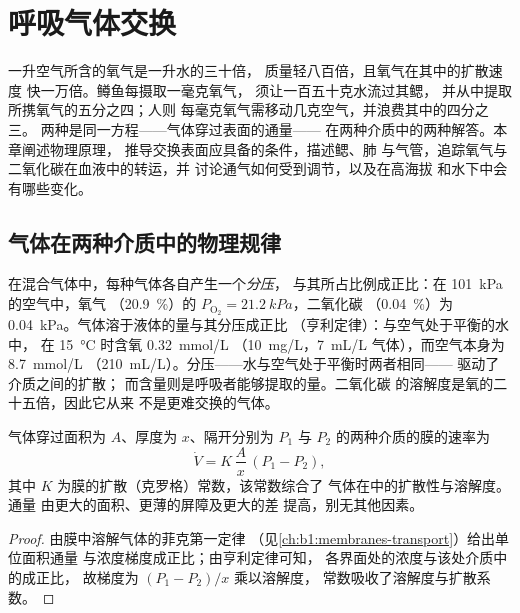 \chapter{呼吸气体交换}\label{ch:b1:gas-exchange}

一升空气所含的氧气是一升水的三十倍，
质量轻八百倍，且氧气在其中的扩散速度
快一万倍。鳟鱼每摄取一毫克氧气，
须让一百五十克水流过其鳃，
并从中提取所携氧气的五分之四；人则
每毫克氧气需移动几克空气，并浪费其中的四分之三。
两种是同一方程——气体穿过表面的通量——
在两种介质中的两种解答。本章阐述物理原理，
推导交换表面应具备的条件，描述鳃、肺
与气管，追踪氧气与二氧化碳在血液中的转运，并
讨论通气如何受到调节，以及在高海拔
和水下中会有哪些变化。

\section{气体在两种介质中的物理规律}

\begin{definition}[分压、溶解度]\label{def:b1:gas-exchange:partial}
在混合气体中，每种气体各自产生一个\emph{分压}，
与其所占比例成正比：在 \qty{101}{kPa} 的空气中，氧气
（\qty{20.9}{\%}）的 $P_{\mathrm{O_2}} = \qty{21.2}{kPa}$，二氧化碳
（\qty{0.04}{\%}）为 \qty{0.04}{kPa}。气体溶于液体的量与其分压成正比
（亨利定律）：与空气处于平衡的水中，
在 \qty{15}{\celsius} 时含氧 \qty{0.32}{mmol/L}
（\qty{10}{mg/L}，\qty{7}{mL/L} 气体），而空气本身为 \qty{8.7}{mmol/L}
（\qty{210}{mL/L}）。分压——水与空气处于平衡时两者相同——
驱动了介质之间的扩散；
而含量则是呼吸者能够提取的量。二氧化碳
的溶解度是氧的二十五倍，因此它从来
不是更难交换的气体。
\end{definition}

\begin{theorem}[交换表面的菲克定律]\label{thm:b1:gas-exchange:fick}
气体穿过面积为 $A$、厚度为
$x$、隔开分别为 $P_1$ 与 $P_2$ 的两种介质的膜的速率为
\[
\dot V = K\,\frac{A}{x}\,(P_1 - P_2),
\]
其中 $K$ 为膜的扩散（克罗格）常数，该常数综合了
气体在中的扩散性与溶解度。通量
由更大的面积、更薄的屏障及更大的差
提高，别无其他因素。
\end{theorem}
\begin{proof}
由膜中溶解气体的菲克第一定律
（见\cref{ch:b1:membranes-transport}）给出单位面积通量
与浓度梯度成正比；由亨利定律可知，
各界面处的浓度与该处介质中的成正比，
故梯度为 $(P_1 - P_2)/x$ 乘以溶解度，
常数吸收了溶解度与扩散系数。
\end{proof}

